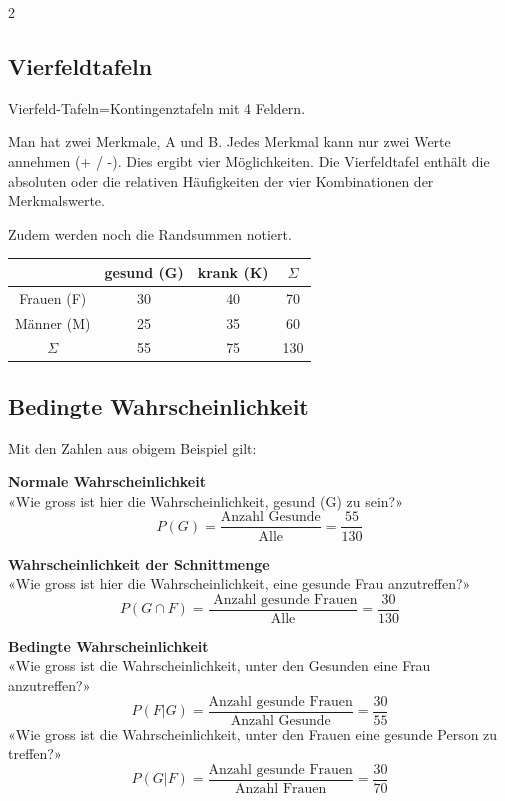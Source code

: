 \begin{multicols}{2}

\subsection*{Vierfeldtafeln}
Vierfeld-Tafeln=Kontingenztafeln mit 4 Feldern.

Man hat zwei Merkmale, A und B. Jedes Merkmal kann nur zwei Werte
annehmen (+ / -). Dies ergibt vier Möglichkeiten. Die Vierfeldtafel
enthält die absoluten oder die relativen Häufigkeiten der vier
Kombinationen der Merkmalswerte.

Zudem werden noch die Randsummen notiert.


\begin{tabular}{c|c|c|c}
           & gesund (G)& krank (K)& $\Sigma$ \\\hline
Frauen (F) &        30 &       40 &       70 \\\hline
Männer (M) &        25 &       35 &       60 \\\hline
$\Sigma$   &        55 &       75 &      130 \\\hline
 \end{tabular}



\subsection*{Bedingte Wahrscheinlichkeit}


Mit den Zahlen aus obigem Beispiel gilt:

\textbf{Normale Wahrscheinlichkeit}\\
«Wie gross ist hier die Wahrscheinlichkeit, gesund (G) zu sein?»
$$P(G) = \frac{\textrm{Anzahl Gesunde}}{\textrm{Alle}} =  \frac{55}{130}$$

\textbf{Wahrscheinlichkeit der Schnittmenge}\\
«Wie gross ist hier die Wahrscheinlichkeit, eine gesunde Frau anzutreffen?»
$$P(G\cap F) = \frac{\textrm{\ Anzahl gesunde Frauen}}{\textrm{Alle}}= \frac{30}{130}$$

\textbf{Bedingte Wahrscheinlichkeit}\\
«Wie gross ist die Wahrscheinlichkeit, unter den Gesunden eine Frau anzutreffen?»
$$P(F | G) = \frac{\textrm{Anzahl gesunde Frauen}}{\textrm{Anzahl Gesunde}} =  \frac{30}{55}$$
«Wie gross ist die Wahrscheinlichkeit, unter den Frauen eine gesunde Person zu treffen?»
$$P(G | F) = \frac{\textrm{Anzahl gesunde Frauen}}{\textrm{Anzahl Frauen}}=  \frac{30}{70}$$

\end{multicols}

